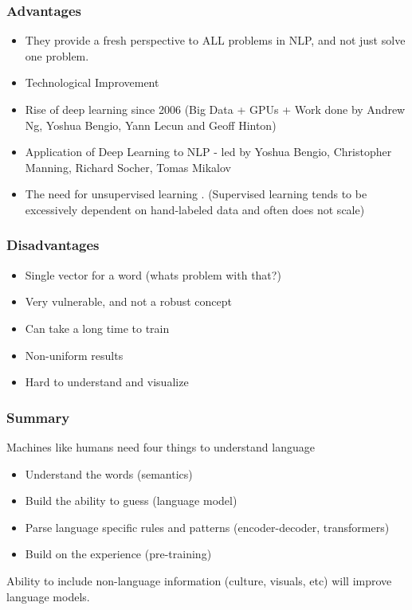 \begin{frame}[fragile]\frametitle{Advantages}

\begin{itemize}
\item They provide a fresh perspective to ALL  problems in NLP, and not just solve one problem.
\item Technological Improvement
\item Rise of deep learning since 2006 (Big Data + GPUs  + Work done by Andrew Ng, Yoshua Bengio, Yann Lecun and Geoff Hinton)
\item Application of Deep Learning to NLP - led by Yoshua Bengio,  Christopher Manning, Richard Socher, Tomas Mikalov
\item The need for unsupervised learning . (Supervised learning tends to be excessively dependent on hand-labeled data and often does not scale)
\end{itemize}
\end{frame}



\begin{frame}[fragile]\frametitle{Disadvantages}
\begin{itemize}
\item Single vector for a word (whats problem with that?)
\item Very vulnerable, and not a robust concept
\item Can take a long time to train
\item Non-uniform results
\item Hard to understand and visualize
\end{itemize}
\end{frame}

\begin{frame}[fragile]\frametitle{Summary}
Machines like humans need four things to understand language

\begin{itemize}
\item Understand the words (semantics)
\item Build the ability to guess (language model)
\item Parse language specific rules and patterns (encoder-decoder, transformers)
\item Build on the experience (pre-training)
\end{itemize}

Ability to include non-language information (culture, visuals, etc) will improve language models.

\end{frame}